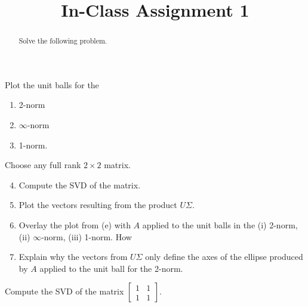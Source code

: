 \documentclass{ximera}
\begin{document}
    \title{In-Class Assignment 1}
    
    \begin{abstract} Solve the following problem.
    \end{abstract}
    \maketitle



\begin{exercise}
    Plot the unit balls for the 
    \begin{enumerate}
        \item 2-norm
        \item $\infty$-norm
        \item 1-norm.
    \end{enumerate}
    Choose any full rank $2 \times 2$ matrix.  
    \begin{enumerate}
    \setcounter{enumi}{3}
        \item Compute the SVD of the matrix.
        \item Plot the vectors resulting from the product $U\Sigma$.
        \item Overlay the plot from (e) with $A$ applied to the unit balls in the (i) 2-norm, (ii) $\infty$-norm, (iii) 1-norm.  How 
        \item Explain why the vectors from $U\Sigma$ only define the axes of the ellipse produced by $A$ applied to the unit ball for the 2-norm.
    \end{enumerate}
\end{exercise}

\begin{exercise}
    Compute the SVD of the matrix $\begin{bmatrix} 1 & 1 \\ 1 &1\end{bmatrix}$.
\end{exercise}
\end{document}
